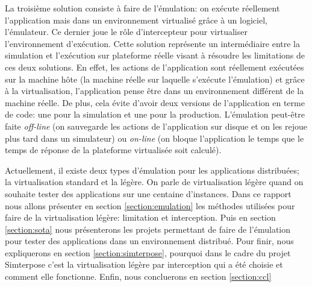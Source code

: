 La troisième solution consiste à faire de l'émulation: on exécute réellement
l'application mais dans un environnement virtualisé grâce à un logiciel,
l'émulateur. Ce dernier joue le rôle d'intercepteur pour virtualiser
l'environnement d'exécution.
Cette solution représente un intermédiaire entre la simulation et l'exécution
sur plateforme réelle visant à résoudre les limitations de ces deux
solutions. En effet, les actions de l'application sont réellement exécutées sur
la machine hôte (la machine réelle sur laquelle s'exécute l'émulation) et grâce
à la virtualisation, l'application pense être dans un environnement différent de
la machine réelle. De plus, cela évite d'avoir deux versions de l'application en
terme de code: une pour la simulation et une pour la production. L'émulation
peut-être faite \textit{off-line} (on sauvegarde les actions de l'application
sur disque et on les rejoue plus tard dans un simulateur) ou \textit{on-line}
(on bloque l'application le temps que le temps de réponse de la plateforme
virtualisée soit calculé).

Actuellement, il existe deux types d'émulation pour les applications
distribuées; la virtualisation standard et la légère. On parle de virtualisation
légère quand on souhaite tester des applications sur une centaine
d'instances. Dans ce rapport nous allons présenter en section
\ref{section:emulation} les méthodes utilisées pour faire de la virtualisation
légère: limitation et interception. Puis en section \ref{section:sota} nous
présenterons les projets permettant de faire de l'émulation pour tester des
applications dans un environnement distribué. Pour finir, nous expliquerons en
section \ref{section:simterpose}, pourquoi dans le cadre du projet Simterpose
c'est la virtualisation légère par interception qui a été choisie et comment
elle fonctionne. Enfin, nous concluerons en section \ref{section:ccl}
